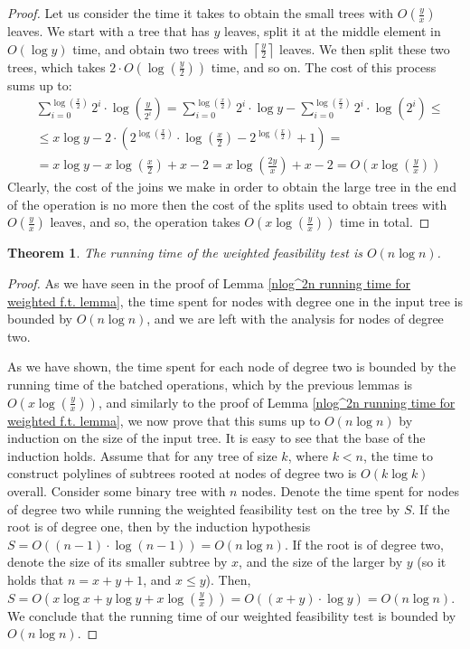 \documentclass[11pt,a4paper]{article}
\newcommand{\ceil}[1]{\left\lceil #1 \right\rceil}
\newtheorem{theorem}{Theorem}[section]
\theoremstyle{definition}
\theoremstyle{remark}
\begin{document}
\begin{proof}
Let us consider the time it takes to obtain the small trees with $O(\frac{y}{x})$ leaves. We start with a tree that has $y$ leaves, split it at the middle element in $O(\log y)$ time, and obtain two trees with $\ceil{\frac{y}{2}}$ leaves. We then split these two trees, which takes $2 \cdot O(\log(\frac{y}{2}))$ time, and so on. The cost of this process sums up to:
\begin{align*}
& \sum_{i=0}^{\log (\frac{x}{2})} 2^i \cdot \log (\frac{y}{2^i}) = \sum_{i=0}^{\log (\frac{x}{2})} 2^i \cdot \log y - \sum_{i=0}^{\log (\frac{x}{2})} 2^i \cdot \log (2^i) \leq \\
& \leq x \log y - 2 \cdot (2^{ \log ( \frac{x}{2})} \cdot \log ( \frac{x}{2}) - 2^{ \log ( \frac{x}{2})}+1) = \\
& = x \log y  -  x \log (\frac{x}{2}) + x - 2 = x \log (\frac{2y}{x}) + x -2 = O(x \log (\frac{y}{x})) 
\end{align*}
Clearly, the cost of the joins we make in order to obtain the large tree in the end of the operation is no more then the cost of the splits used to obtain trees with $O(\frac{y}{x})$ leaves, and so, the operation takes $O(x \log (\frac{y}{x}))$ time in total.
\end{proof}

\begin{theorem}
The running time of the weighted feasibility test is $O(n \log n)$.
\end{theorem}
\begin{proof}
As we have seen in the proof of Lemma \ref{nlog^2n running time for weighted f.t. lemma}, the time spent for nodes with degree one in the input tree is bounded by $O(n \log n)$, and we are left with the analysis for nodes of degree two.

As we have shown, the time spent for each node of degree two is bounded by the running time of the batched operations, which by the previous lemmas is $O(x \log (\frac{y}{x}))$, and similarly to the proof of Lemma \ref{nlog^2n running time for weighted f.t. lemma}, we now prove that this sums up to $O(n \log n)$ by induction on the size of the input tree. It is easy to see that the base of the induction holds. Assume that for any tree of size $k$, where $k<n$, the time to construct polylines of subtrees rooted at nodes of degree two is $O(k \log k)$ overall. Consider some binary tree with $n$ nodes. Denote the time spent for nodes of degree two while running the weighted feasibility test on the tree by $S$. If the root is of degree one, then by the induction hypothesis $S=O((n-1)\cdot \log(n-1))=O(n \log n)$. If the root is of degree two, denote the size of its smaller subtree by $x$, and the size of the larger by $y$ (so it holds that $n=x+y+1$, and $x \leq y$). Then, $S= O(x \log x + y \log y + x \log (\frac{y}{x})) = O((x+y) \cdot \log y) = O(n \log n)$. We conclude that the running time of our weighted feasibility test is bounded by $O(n \log n)$.
\end{proof}



\end{document}
